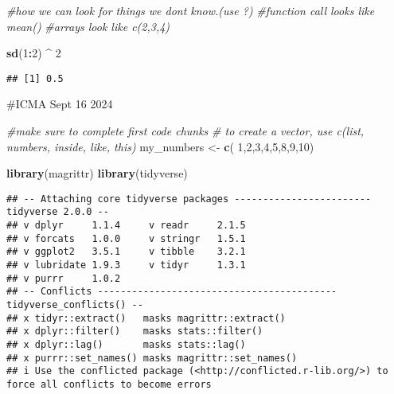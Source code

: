 \documentclass[
]{article}
\newenvironment{Shaded}{\begin{snugshade}}{\end{snugshade}}
\newcommand{\CommentTok}[1]{\textcolor[rgb]{0.56,0.35,0.01}{\textit{#1}}}
\newcommand{\DecValTok}[1]{\textcolor[rgb]{0.00,0.00,0.81}{#1}}
\newcommand{\FunctionTok}[1]{\textcolor[rgb]{0.13,0.29,0.53}{\textbf{#1}}}
\newcommand{\NormalTok}[1]{#1}
\newcommand{\OtherTok}[1]{\textcolor[rgb]{0.56,0.35,0.01}{#1}}
\newcommand{\SpecialCharTok}[1]{\textcolor[rgb]{0.81,0.36,0.00}{\textbf{#1}}}
\begin{document}
\begin{Shaded}
\begin{Highlighting}[]
\CommentTok{\#how we can look for things we don\textquotesingle{}t know.(use ?)}
\CommentTok{\#function call looks like mean()}
\CommentTok{\#arrays look like c(2,3,4)}
\end{Highlighting}
\end{Shaded}

\begin{Shaded}
\begin{Highlighting}[]
\FunctionTok{sd}\NormalTok{(}\DecValTok{1}\SpecialCharTok{:}\DecValTok{2}\NormalTok{) }\SpecialCharTok{\^{}} \DecValTok{2}
\end{Highlighting}
\end{Shaded}

\begin{verbatim}
## [1] 0.5
\end{verbatim}

\#ICMA Sept 16 2024

\begin{Shaded}
\begin{Highlighting}[]
\CommentTok{\#make sure to complete first code chunks }
\CommentTok{\# to create a vector, use c(list, numbers, inside, like, this)}
\NormalTok{my\_numbers }\OtherTok{\textless{}{-}} \FunctionTok{c}\NormalTok{( }\DecValTok{1}\NormalTok{,}\DecValTok{2}\NormalTok{,}\DecValTok{3}\NormalTok{,}\DecValTok{4}\NormalTok{,}\DecValTok{5}\NormalTok{,}\DecValTok{8}\NormalTok{,}\DecValTok{9}\NormalTok{,}\DecValTok{10}\NormalTok{)}
\end{Highlighting}
\end{Shaded}

\begin{Shaded}
\begin{Highlighting}[]
\FunctionTok{library}\NormalTok{(magrittr)}
\FunctionTok{library}\NormalTok{(tidyverse)}
\end{Highlighting}
\end{Shaded}

\begin{verbatim}
## -- Attaching core tidyverse packages ------------------------ tidyverse 2.0.0 --
## v dplyr     1.1.4     v readr     2.1.5
## v forcats   1.0.0     v stringr   1.5.1
## v ggplot2   3.5.1     v tibble    3.2.1
## v lubridate 1.9.3     v tidyr     1.3.1
## v purrr     1.0.2     
## -- Conflicts ------------------------------------------ tidyverse_conflicts() --
## x tidyr::extract()   masks magrittr::extract()
## x dplyr::filter()    masks stats::filter()
## x dplyr::lag()       masks stats::lag()
## x purrr::set_names() masks magrittr::set_names()
## i Use the conflicted package (<http://conflicted.r-lib.org/>) to force all conflicts to become errors
\end{verbatim}
\end{document}
